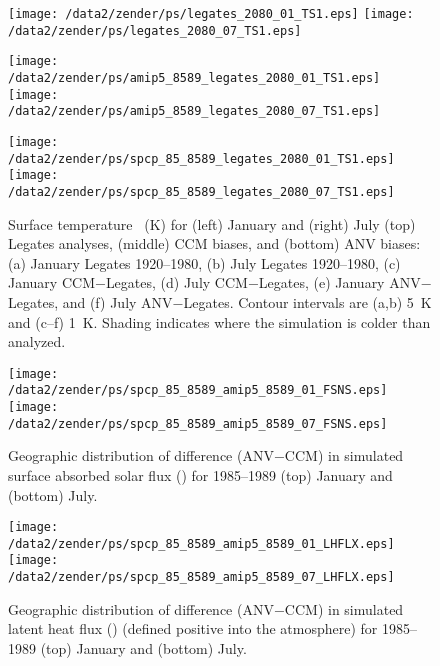 \documentclass[twocolumn,final]{article}
\begin{document}
\begin{figure*}
\begin{center}
\texttt{[image: /data2/zender/ps/legates\_2080\_01\_TS1.eps]}%
\texttt{[image: /data2/zender/ps/legates\_2080\_07\_TS1.eps]}%

\texttt{[image: /data2/zender/ps/amip5\_8589\_legates\_2080\_01\_TS1.eps]}%
\texttt{[image: /data2/zender/ps/amip5\_8589\_legates\_2080\_07\_TS1.eps]}%

\texttt{[image: /data2/zender/ps/spcp\_85\_8589\_legates\_2080\_01\_TS1.eps]}%
\texttt{[image: /data2/zender/ps/spcp\_85\_8589\_legates\_2080\_07\_TS1.eps]}%
\end{center}
\caption[Surface temperature \Ts\ for January and
July Legates analyses, CCM biases, and ANV biases]{
Surface temperature \Ts\ (\degreee K) for (left) January
and (right) July (top) Legates analyses, (middle) CCM biases, and
(bottom) ANV biases: (a) January Legates 1920--1980, (b) July Legates
1920--1980,
(c) January CCM$-$Legates, (d) July CCM$-$Legates, (e) January
ANV$-$Legates, and (f) July ANV$-$Legates.
Contour intervals are (a,b) 5~\degreee K and (c--f) 1~\degreee K. 
Shading indicates where the simulation is colder than analyzed.
\label{fig:pres_8589_TS1}}   
\end{figure*}
\clearpage

\begin{figure}
\begin{center}
\texttt{[image: /data2/zender/ps/spcp\_85\_8589\_amip5\_8589\_01\_FSNS.eps]}\vfill
\texttt{[image: /data2/zender/ps/spcp\_85\_8589\_amip5\_8589\_07\_FSNS.eps]}\vfill
\end{center}
\caption[Geographic distribution of difference (ANV$-$CCM) in
simulated surface absorbed solar flux between ANV and CCM for
January and July 1985--1989]{ 
Geographic distribution of difference (ANV$-$CCM) in simulated
surface absorbed solar flux (\wxmS) for 1985--1989 (top) January and
(bottom) July. 
\label{fig:spcp_85_8589_amip5_8589_FSNS}}
\end{figure}

\begin{figure}
\begin{center}
\texttt{[image: /data2/zender/ps/spcp\_85\_8589\_amip5\_8589\_01\_LHFLX.eps]}\vfill
\texttt{[image: /data2/zender/ps/spcp\_85\_8589\_amip5\_8589\_07\_LHFLX.eps]}\vfill
\end{center}
\caption[Geographic distribution of difference (ANV$-$CCM) in
simulated surface latent heat flux between ANV and CCM for
January and July 1985--1989]{ 
Geographic distribution of difference (ANV$-$CCM) in simulated
latent heat flux (\wxmS) (defined positive into the atmosphere) for
1985--1989 (top) January and (bottom) July. 
\label{fig:spcp_85_8589_amip5_8589_LHFLX}}
\end{figure}
\end{document}
